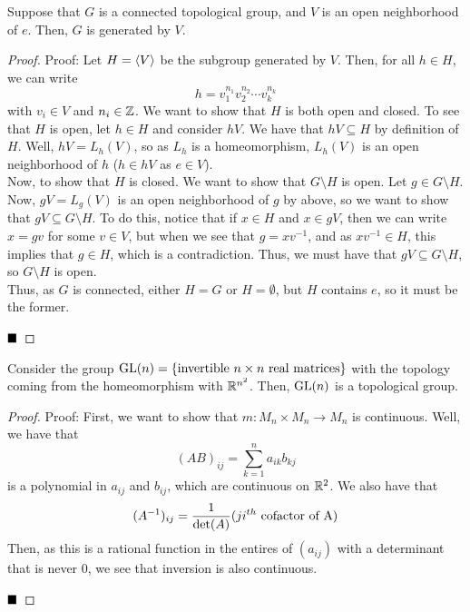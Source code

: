 \begin{lemma}
    Suppose that $G$ is a connected topological group, and $V$ is an open neighborhood of $e$. Then, $G$ is generated by $V$. 
\end{lemma}
\begin{proof}{Proof:}
    Let $H = \brac{V}$ be the subgroup generated by $V$. Then, for all $h \in H$, we can write
    \[ h = v_1^{n_1}v_2^{n_2} \cdots v_{k}^{n_k} \]
    with $v_i \in V$ and $n_i \in \Z$. We want to show that $H$ is both open and closed. To see that $H$ is open, let $h \in H$ and consider $hV$. We have that $hV \subseteq H$ by definition of $H$. Well, $hV = L_{h}(V)$, so as $L_{h}$ is a homeomorphism, $L_{h}(V)$ is an open neighborhood of $h$ ($h \in hV$ as $e \in V$).\\

    Now, to show that $H$ is closed. We want to show that $G \setminus H$ is open. Let $g \in G \setminus H$. Now, $gV = L_{g}(V)$ is an open neighborhood of $g$ by above, so we want to show that $gV \subseteq G \setminus H$. To do this, notice that if $x \in H$ and $x \in gV$, then we can write $x = gv$ for some $v \in V$, but when we see that $g = xv^{-1}$, and as $xv^{-1} \in H$, this implies that $g \in H$, which is a contradiction. Thus, we must have that $gV \subseteq G \setminus H$, so $G \setminus H$ is open.\\

    Thus, as $G$ is connected, either $H = G$ or $H = \emptyset$, but $H$ contains $e$, so it must be the former. 

    $\qed$
\end{proof}

\begin{lemma}
    Consider the group $\tt{GL}(n) = \{\tt{invertible } n \times n \tt{ real matrices}\}$ with the topology coming from the homeomorphism with $\R^{n^2}$. Then, $\tt{GL}(n)$ is a topological group.
\end{lemma}
\begin{proof}{Proof:}
    First, we want to show that $m : M_{n} \times M_{n} \to M_{n}$ is continuous. Well, we have that
    \[ (AB)_{ij} = \sum_{k = 1}^{n} a_{ik}b_{kj} \]
    is a polynomial in $a_{ij}$ and $b_{ij}$, which are continuous on $\R^2$. We also have that
    \[ (A^{-1})_{ij} = \frac{1}{\det(A)} (ji^{th} \tt{ cofactor of A}) \]
    Then, as this is a rational function in the entires of $(a_{ij})$ with a determinant that is never $0$, we see that inversion is also continuous.

    $\qed$
\end{proof}

